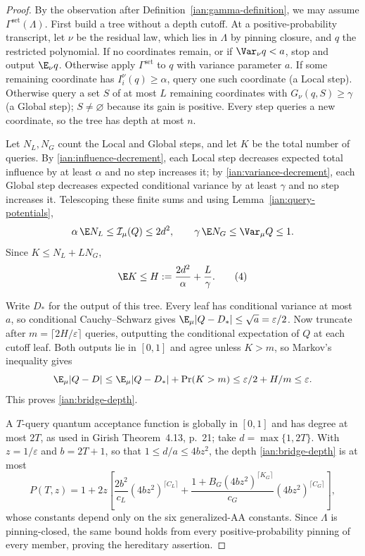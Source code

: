 \begin{proof}
By the observation after Definition~\ref{ian:gamma-definition}, we may
assume \(\Gamma^{\mathrm{set}}(\Lambda)\).
First build a tree without a depth cutoff. At a positive-probability
transcript, let \(\nu\) be the residual law, which lies in \(\Lambda\)
by pinning closure, and \(q\) the restricted polynomial. If no
coordinates remain, or if \(\Var_\nu q<a\), stop and output
\(\E_\nu q\). Otherwise apply \(\Gamma^{\mathrm{set}}\) to \(q\) with
variance parameter \(a\). If some remaining coordinate has
\(I_i^\nu(q)\ge\alpha\), query one such coordinate (a Local step).
Otherwise query a set \(S\) of at most \(L\) remaining coordinates with
\(G_\nu(q,S)\ge\gamma\) (a Global step); \(S\neq\varnothing\) because
its gain is positive. Every step queries a new coordinate, so the tree
has depth at most \(n\).

Let \(N_L,N_G\) count the Local and Global steps, and let \(K\) be the
total number of queries. By \eqref{ian:influence-decrement}, each Local
step decreases expected total influence by at least \(\alpha\) and no
step increases it; by \eqref{ian:variance-decrement}, each Global step
decreases expected conditional variance by at least \(\gamma\) and no
step increases it. Telescoping these finite sums and using
Lemma~\ref{ian:query-potentials},
\[
 \alpha\,\E N_L\le\mathcal I_\mu(Q)\le2d^2,
 \qquad
 \gamma\,\E N_G\le\Var_\mu Q\le1.
\]
Since \(K\le N_L+LN_G\),
\[
 \E K\le H:=\frac{2d^2}{\alpha}+\frac{L}{\gamma}.
 \tag{4}\label{ian:expected-query-bound}
\]

Write \(D_*\) for the output of this tree. Every leaf has conditional
variance at most \(a\), so conditional Cauchy--Schwarz gives
\(\E_\mu|Q-D_*|\le\sqrt a=\varepsilon/2\).
Now truncate after \(m=\lceil2H/\varepsilon\rceil\) queries, outputting
the conditional expectation of \(Q\) at each cutoff leaf. Both outputs
lie in \([0,1]\) and agree unless \(K>m\), so Markov's inequality gives
\[
 \E_\mu|Q-D|
 \le\E_\mu|Q-D_*|+\Pr(K>m)
 \le\varepsilon/2+H/m\le\varepsilon.
\]
This proves \eqref{ian:bridge-depth}.

A \(T\)-query quantum acceptance function is globally in \([0,1]\)
and has degree at most \(2T\), as used in Girish Theorem~4.13, p.~21;
take \(d=\max\{1,2T\}\). With \(z=1/\varepsilon\) and \(b=2T+1\), so
that \(1\le d/a\le4bz^2\), the depth \eqref{ian:bridge-depth} is at most
\[
 P(T,z)=1+2z\left[
 \frac{2b^2}{c_L}(4bz^2)^{\lceil C_L\rceil}
 +\frac{1+B_G(4bz^2)^{\lceil K_G\rceil}}{c_G}
       (4bz^2)^{\lceil C_G\rceil}
 \right],
\]
whose constants depend only on the six generalized-AA constants.
Since \(\Lambda\) is pinning-closed, the same bound holds from every
positive-probability pinning of every member, proving the hereditary
assertion.
\end{proof}

